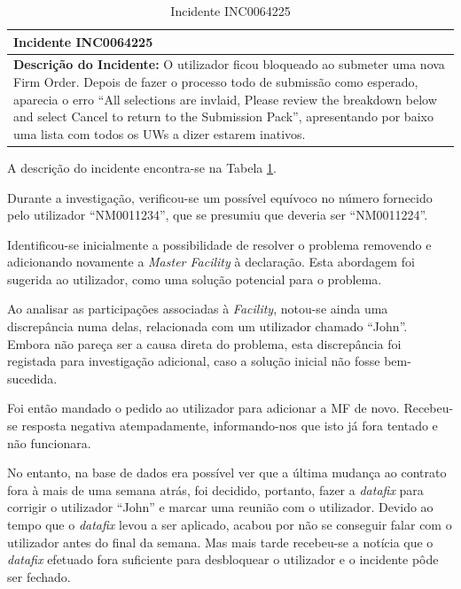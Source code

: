             \begin{table}[H] %
                \centering
                \begin{tabularx}{1\textwidth}{|>{\raggedright\arraybackslash}X|}
                    \hline
                    \rowcolor{lightgray}
                    \textbf{Incidente INC0064225} \\
                    \hline
                    \rowcolor{lightgray!20}
                  
                    \textbf{Descrição do Incidente:} O utilizador ficou bloqueado ao submeter uma nova Firm Order. Depois de fazer o processo todo de submissão como esperado, aparecia o erro ``All selections are invlaid, Please review the breakdown below and select Cancel to return to the Submission Pack'', apresentando por baixo uma lista com todos os UWs a dizer estarem inativos.

                    \\
                    \hline
                \end{tabularx}
                \caption{Incidente INC0064225}\label{table:usincINC0064225}
            \end{table}

            A descrição do incidente encontra-se na Tabela \ref{table:usincINC0064225}.

            Durante a investigação, verificou-se um possível equívoco no número fornecido pelo utilizador ``NM0011234'', que se presumiu que deveria ser ``NM0011224''. 

            Identificou-se inicialmente a possibilidade de resolver o problema removendo e adicionando novamente a \textit{Master Facility} à declaração. Esta abordagem foi sugerida ao utilizador, como uma solução potencial para o problema.
            
            Ao analisar as participações associadas à \textit{Facility}, notou-se ainda uma discrepância numa delas, relacionada com um utilizador chamado ``John''. Embora não pareça ser a causa direta do problema, esta discrepância foi registada para investigação adicional, caso a solução inicial não fosse bem-sucedida.

            Foi então mandado o pedido ao utilizador para adicionar a MF de novo. Recebeu-se resposta negativa atempadamente, informando-nos que isto já fora tentado e não funcionara.
            
            No entanto, na base de dados era possível ver que a última mudança ao contrato fora à mais de uma semana atrás, foi decidido, portanto, fazer a \textit{datafix} para corrigir o utilizador ``John'' e marcar uma reunião com o utilizador. Devido ao tempo que o \textit{datafix} levou a ser aplicado, acabou por não se conseguir falar com o utilizador antes do final da semana. Mas mais tarde recebeu-se a notícia que o \textit{datafix} efetuado fora suficiente para desbloquear o utilizador e o incidente pôde ser fechado.
            
